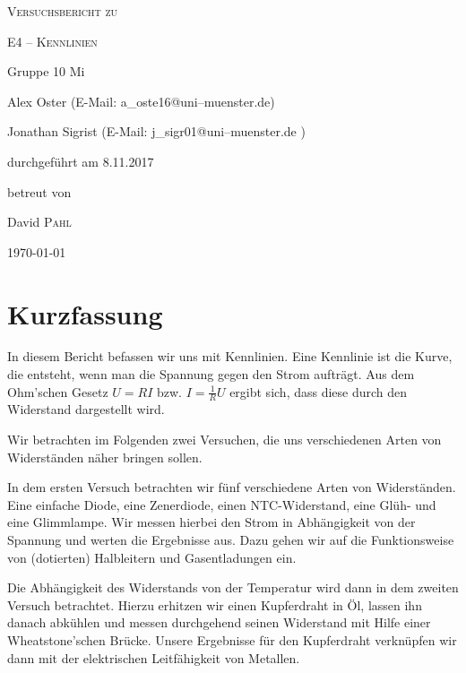 \documentclass[11pt,a4paper,titlepage, ngerman]{article}
\begin{document}
	
	\begin{titlepage}
		\centering
		{\scshape\LARGE Versuchsbericht zu \par}
		\vspace{1cm}
		{\scshape\huge E4 -- Kennlinien\par}
		\vspace{2.5cm}
		{\LARGE Gruppe 10 Mi\par}
		\vspace{0.5cm}
		{\large Alex Oster (E-Mail: a\_oste16@uni--muenster.de) \par}
		{\large Jonathan Sigrist (E-Mail: j\_sigr01@uni--muenster.de ) \par}
		\vfill
		durchgeführt am 8.11.2017\par
		betreut von\par
		{\large David \textsc{Pahl}}
		
		\vfill
		
		{\large \today\par}
	\end{titlepage}
		
	\tableofcontents
	
	\newpage
	
	\section{Kurzfassung}
		
		In diesem Bericht befassen wir uns mit Kennlinien. Eine Kennlinie ist die Kurve, die entsteht, wenn man die Spannung gegen den Strom aufträgt. Aus dem Ohm'schen Gesetz $U=RI$ bzw. $I = \frac{1}{R}U $ ergibt sich, dass diese durch den Widerstand dargestellt wird. 
		
		Wir betrachten im Folgenden zwei Versuchen, die uns verschiedenen Arten von Widerständen näher bringen sollen. 
		
		In dem ersten Versuch betrachten wir fünf verschiedene Arten von Widerständen. Eine einfache Diode, eine Zenerdiode, einen NTC-Widerstand, eine Glüh- und eine Glimmlampe. Wir messen hierbei den Strom in Abhängigkeit von der Spannung und werten die Ergebnisse aus. Dazu gehen wir auf die Funktionsweise von (dotierten) Halbleitern und Gasentladungen ein. 
		
		Die Abhängigkeit des Widerstands von der Temperatur wird dann in dem zweiten Versuch betrachtet.
		Hierzu erhitzen wir einen Kupferdraht in Öl, lassen ihn danach abkühlen und messen durchgehend seinen Widerstand mit Hilfe einer Wheatstone'schen Brücke. Unsere Ergebnisse für den Kupferdraht verknüpfen wir dann mit der elektrischen Leitfähigkeit von Metallen.
\end{document}
